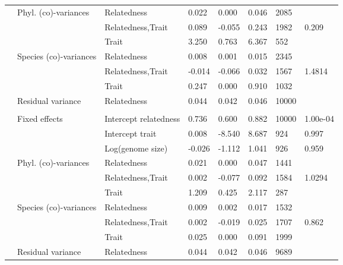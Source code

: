 \begin{longtable}[t]{llllllll}
\hspace{1em} & Phyl. (co)-variances & Relatedness & 0.022 & 0.000 & 0.046 & 2085 & \\
\hspace{1em} &  & Relatedness,Trait & 0.089 & -0.055 & 0.243 & 1982 & 0.209\\
\hspace{1em} &  & Trait & 3.250 & 0.763 & 6.367 & 552 & \\
\hspace{1em} & Species (co)-variances & Relatedness & 0.008 & 0.001 & 0.015 & 2345 & \\
\hspace{1em} &  & Relatedness,Trait & -0.014 & -0.066 & 0.032 & 1567 & 1.4814\\
\hspace{1em} &  & Trait & 0.247 & 0.000 & 0.910 & 1032 & \\
\hspace{1em} & Residual variance & Relatedness & 0.044 & 0.042 & 0.046 & 10000 & \\
\addlinespace[0.3em]
\multicolumn{8}{l}{\textbf{Quorum sensing}}\\
\hspace{1em} & Fixed effects & Intercept relatedness & 0.736 & 0.600 & 0.882 & 10000 & 1.00e-04\\
\hspace{1em} &  & Intercept trait & 0.008 & -8.540 & 8.687 & 924 & 0.997\\
\hspace{1em} &  & Log(genome size) & -0.026 & -1.112 & 1.041 & 926 & 0.959\\
\hspace{1em} & Phyl. (co)-variances & Relatedness & 0.021 & 0.000 & 0.047 & 1441 & \\
\hspace{1em} &  & Relatedness,Trait & 0.002 & -0.077 & 0.092 & 1584 & 1.0294\\
\hspace{1em} &  & Trait & 1.209 & 0.425 & 2.117 & 287 & \\
\hspace{1em} & Species (co)-variances & Relatedness & 0.009 & 0.002 & 0.017 & 1532 & \\
\hspace{1em} &  & Relatedness,Trait & 0.002 & -0.019 & 0.025 & 1707 & 0.862\\
\hspace{1em} &  & Trait & 0.025 & 0.000 & 0.091 & 1999 & \\
\hspace{1em} & Residual variance & Relatedness & 0.044 & 0.042 & 0.046 & 9689 & \\*
\end{longtable}
